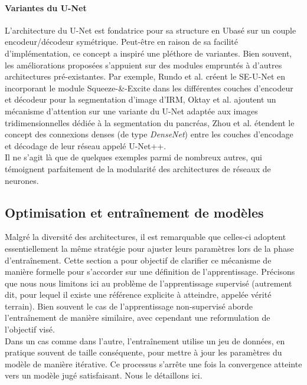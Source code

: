 \paragraph{Variantes du U-Net}
L'architecture du U-Net est fondatrice pour sa structure en \og U\fg basé sur un couple encodeur/décodeur symétrique. Peut-être en raison de sa facilité d'implémentation, ce concept a inspiré une pléthore de variantes. Bien souvent, les améliorations proposées s'appuient sur des modules empruntés à d'autres architectures pré-existantes. Par exemple, Rundo et al. \cite{rundoUSENetIncorporatingSqueezeandExcitation2019} créent le SE-U-Net en incorporant le module Squeeze-\&-Excite dans les différentes couches d'encodeur et décodeur pour la segmentation d'image d'IRM, Oktay et al. \cite{oktayAttentionUNetLearning2022} ajoutent un mécanisme d'attention sur une variante du U-Net adaptée aux images tridimensionnelles dédiée à la segmentation du pancréas, Zhou et al. \cite{zhouUNetRedesigningSkip2020} étendent le concept des connexions denses (de type \textit{DenseNet}) entre les couches d'encodage et décodage de leur réseau appelé U-Net++. 
\\
Il ne s'agit là que de quelques exemples parmi de nombreux autres, qui témoignent parfaitement de la modularité des architectures de réseaux de neurones. 

\newpage

\subsection{Optimisation et entraînement de modèles}
Malgré la diversité des architectures, il est remarquable que celles-ci adoptent essentiellement la même stratégie pour ajuster leurs paramètres lors de la phase d'entraînement. Cette section a pour objectif de clarifier ce mécanisme de manière formelle pour s'accorder sur une définition de l'apprentissage. Précisons que nous nous limitons ici au problème de l'apprentissage supervisé (autrement dit, pour lequel il existe une référence explicite à atteindre, appelée vérité terrain). Bien souvent le cas de l'apprentissage non-supervisé aborde l'entraînement de manière similaire, avec cependant une reformulation de l'objectif visé. \\
Dans un cas comme dans l'autre, l'entraînement utilise un jeu de données, en pratique souvent de taille conséquente, pour mettre à jour les paramètres du modèle de manière itérative. Ce processus s'arrête une fois la convergence atteinte vers un modèle jugé satisfaisant. Nous le détaillons ici.\\

